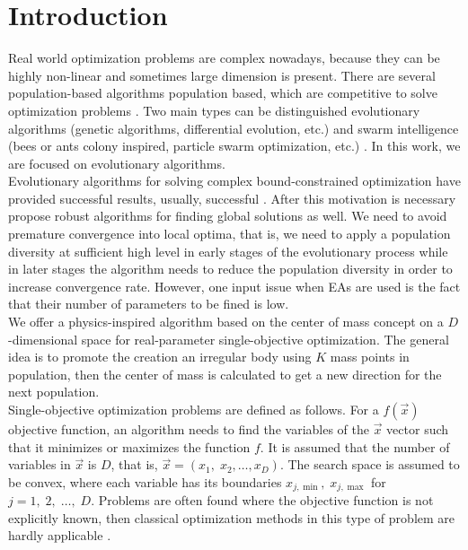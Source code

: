 \documentclass[graybox]{svmult}
\begin{document}
\section{Introduction}
Real world optimization problems  are complex nowadays, because they can be highly non-linear and sometimes large dimension is present. There are several population-based algorithms population based, which are competitive to solve optimization problems \cite{easSurv}.  %
Two main  types can be distinguished 
evolutionary algorithms (genetic algorithms, differential evolution, etc.) \cite{jso2017, melanie96, ed1995} and swarm intelligence (bees or ants colony inspired, particle swarm optimization, etc.) \cite{abc2005,pso1995}. In this work, we are focused on evolutionary algorithms.\\

Evolutionary algorithms for solving complex bound-constrained optimization have provided successful results, usually, successful \cite{ed1995}. After this motivation is necessary propose robust algorithms for finding global solutions as well. We need to avoid premature convergence into local optima, that is, we need to apply a population diversity at sufficient high level in early stages of the evolutionary process while in later stages the algorithm needs to reduce the population diversity in order to increase convergence rate. %
However, one input issue when EAs are used is the fact that their number of parameters to be fined is low.
\\

We offer a  physics-inspired algorithm based on the center of mass concept on a $D$-dimensional space for  real-parameter single-objective optimization. The general idea is to promote the creation an irregular body using $K$ mass points in population, then the center of mass is calculated to get a new direction for the next population.\\

Single-objective optimization problems are defined as follows. For a $f(\vec{x})$ objective function, an
algorithm needs to find the variables of the $\vec{x}$ vector such that it minimizes or maximizes the function
$f$. It is assumed that the number of variables in $\vec{x}$ is $D$, that is, $\vec{x} = (x_1,\; x_2 , \ldots , x_D )$. The search space is assumed to be
convex, where each variable has its  boundaries $x_{j, \min}, \;  x_{j, \max} $ for $j = 1,\; 2,\; \ldots,\; D$. Problems are often 
found where the objective function is not explicitly known, then classical optimization methods in this type of problem are hardly applicable \cite{problemas}.\\
\end{document}
